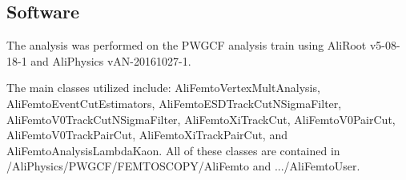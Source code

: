 \documentclass[../AnalysisNoteJBuxton.tex]{subfiles}
\begin{document}
\subsection{Software}
\label{sec:Software}

The analysis was performed on the PWGCF analysis train using AliRoot v5-08-18-1 and AliPhysics vAN-20161027-1.

The main classes utilized include: AliFemtoVertexMultAnalysis, AliFemtoEventCutEstimators, AliFemtoESDTrackCutNSigmaFilter, AliFemtoV0TrackCutNSigmaFilter, AliFemtoXiTrackCut, AliFemtoV0PairCut, AliFemtoV0TrackPairCut, AliFemtoXiTrackPairCut, and AliFemtoAnalysisLambdaKaon.
All of these classes are contained in /AliPhysics/PWGCF/FEMTOSCOPY/AliFemto and .../AliFemtoUser.
\end{document}
